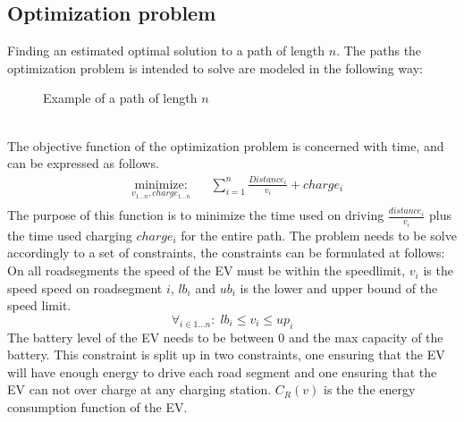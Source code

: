 \subsection{Optimization problem}
Finding an estimated optimal solution to a path of length $n$. The paths the optimization problem is intended to solve are modeled in the following way: \\
\begin{figure}[h!]
\centering
    \caption{Example of a path of length $n$} \label{fig:pathexample}
\end{figure} \\
The objective function of the optimization problem is concerned with time, and can be expressed as follows.
\begin{equation}
\begin{aligned}
 & \underset{v_{1 \dots n},charge_{1 \dots n}}
{\text{minimize:}}
& & \sum_{i=1}^{n} \frac{Distance_i}{v_i} + charge_i \\
\end{aligned}
\end{equation}\label{eq:objfunction}
The purpose of this function is to minimize the time used on driving $\frac{distance_i}{v_i}$ plus the time used charging $charge_i$ for the entire path. 
The problem needs to be solve accordingly to a set of constraints, the constraints can be formulated at follows: \\
On all roadsegments the speed of the EV must be within the speedlimit, $v_i$ is the speed speed on roadsegment $i$, $lb_i$ and $ub_i$ is the lower and upper bound of the speed limit. 
\begin{equation}
\forall_{i \in 1 \dots n}: \; lb_i \leq v_i \leq up_i
\end{equation}
The battery level of the EV needs to be between $0$ and the max capacity of the battery. This constraint is split up in two constraints, one ensuring that the EV will have enough energy to drive each road segment and one ensuring that the EV can not over charge at any charging station. $C_R(v)$ is the the energy consumption function of the EV. 
